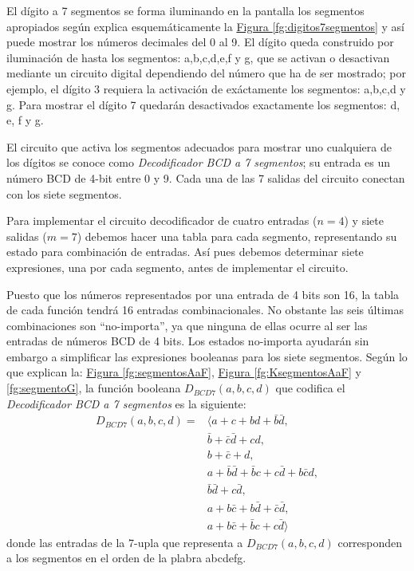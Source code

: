 \begin{example}
  \label{ex:digitos7segmentos}
  El dígito a 7 segmentos se forma iluminando en la pantalla los
  segmentos apropiados según explica esquemáticamente la
  \hyperref[fg:digitos7segmentos]{Figura \ref*{fg:digitos7segmentos}}
  y así puede mostrar los números decimales del 0 al 9. El dígito
  queda construido por iluminación de hasta los segmentos: a,b,c,d,e,f
  y g, que se activan o desactivan mediante un circuito digital
  dependiendo del número que ha de ser mostrado; por ejemplo, el
  dígito 3 requiera la activación de exáctamente los segmentos:
  a,b,c,d y g. Para mostrar el dígito 7 quedarán desactivados
  exactamente los segmentos: d, e, f y g.

  El circuito que activa los segmentos adecuados para mostrar uno
  cualquiera de los dígitos se conoce como \textit{Decodificador BCD a
    7 segmentos}; su entrada es un número BCD de 4-bit entre 0 y
  9. Cada una de las 7 salidas del circuito conectan con los siete
  segmentos.

  Para implementar el circuito decodificador de cuatro entradas
  ($n=4$) y siete salidas ($m=7$) debemos hacer una tabla para cada
  segmento, representando su estado para combinación de entradas. Así
  pues debemos determinar siete expresiones, una por cada segmento,
  antes de implementar el circuito.

  Puesto que los números representados por una entrada de 4 bits son
  16, la tabla de cada función tendrá 16 entradas combinacionales. No
  obstante las seis últimas combinaciones son ``no-importa'', ya que
  ninguna de ellas ocurre al ser las entradas de números BCD de 4
  bits. Los estados no-importa ayudarán sin embargo a simplificar las
  expresiones booleanas para los siete segmentos. Según lo que
  explican la: \hyperref[fg:segmentosAaF]{Figura
    \ref*{fg:segmentosAaF}}, \hyperref[fg:KsegmentosAaF]{Figura
    \ref*{fg:KsegmentosAaF}} y
  \hyperref[fg:segmentoG]{\ref*{fg:segmentoG}}, la función booleana
  $D_{BCD7}(a,b,c,d)$ que codifica el \textit{Decodificador BCD a
    7 segmentos} es la siguiente:
  \begin{align*}
    D_{BCD7}(a,b,c,d)=&\langle a+c+bd+\bar{b}\bar{d},\\
                    &\bar{b}+\bar{c}\bar{d}+cd,\\
                    &b+\bar{c}+d,\\
                    &a+\bar{b}\bar{d}+\bar{b}c+c\bar{d}+b\bar{c}d,\\
                    &\bar{b}\bar{d}+c\bar{d},\\
                    &a+b\bar{c}+b\bar{d}+\bar{c}\bar{d},\\
                    &a+b\bar{c}+\bar{b}c+c\bar{d}\rangle
  \end{align*}
  donde las entradas de la 7-upla que representa a $D_{BCD7}(a,b,c,d)$
  corresponden a los segmentos en el orden de la plabra abcdefg.
\end{example}

